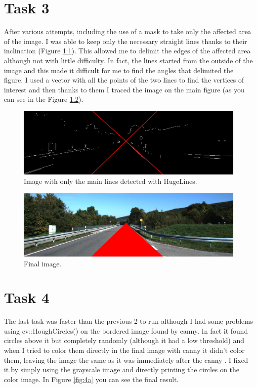 \chapter{Task 3}
After various attempts, including the use of a mask to take only the affected area of the image. I was able to keep only the necessary straight lines thanks to their inclination (Figure \ref{fig:3a}). This allowed me to delimit the edges of the affected area although not with little difficulty. In fact, the lines started from the outside of the image and this made it difficult for me to find the angles that delimited the figure. I used a vector with all the points of the two lines to find the vertices of interest and then thanks to them I traced the image on the main figure (as you can see in the Figure \ref{fig:3b}).

\begin{figure}[h]
	\centering
	\begin{minipage}{1\textwidth}
		\centering
		\includegraphics[width=\linewidth]{images/source/task3/1}
		\caption{Image with only the main lines detected with HugeLines.}
		\label{fig:3a}
        \end{minipage}
\end{figure}

\begin{figure}[h]
	\centering
        \begin{minipage}{1\textwidth}
        		\centering
		\includegraphics[width=\linewidth]{images/source/task3/2}
		\caption{Final image.}
		\label{fig:3b}
        \end{minipage}
\end{figure}

\chapter{Task 4}
The last task was faster than the previous 2 to run although I had some problems using cv::HoughCircles() on the bordered image found by canny. In fact it found circles above it but completely randomly (although it had a low threshold) and when I tried to color them directly in the final image with canny it didn't color them, leaving the image the same as it was immediately after the canny . I fixed it by simply using the grayscale image and directly printing the circles on the color image. In Figure \ref{fig:4a} you can see the final result.

